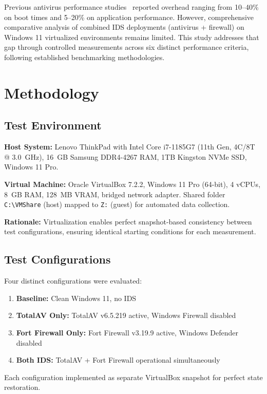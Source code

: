 \documentclass[runningheads,a4paper,english]{llncs}[2022/01/12]
\begin{document}
Previous antivirus performance studies~\cite{tomshardware-antivirus} reported overhead ranging from 10--40\% on boot times and 5--20\% on application performance. However, comprehensive comparative analysis of combined IDS deployments (antivirus + firewall) on Windows 11 virtualized environments remains limited. This study addresses that gap through controlled measurements across six distinct performance criteria, following established benchmarking methodologies.

\section{Methodology}
\label{sec:methodology}

\subsection{Test Environment}

\textbf{Host System:} Lenovo ThinkPad with Intel Core i7-1185G7 (11th Gen, 4C/8T @ 3.0~GHz), 16~GB Samsung DDR4-4267 RAM, 1TB Kingston NVMe SSD, Windows 11 Pro.

\textbf{Virtual Machine:} Oracle VirtualBox 7.2.2, Windows 11 Pro (64-bit), 4 vCPUs, 8~GB RAM, 128~MB VRAM, bridged network adapter. Shared folder \texttt{C:\textbackslash VMShare} (host) mapped to \texttt{Z:} (guest) for automated data collection.

\textbf{Rationale:} Virtualization enables perfect snapshot-based consistency between test configurations, ensuring identical starting conditions for each measurement.

\subsection{Test Configurations}

Four distinct configurations were evaluated:
\begin{enumerate}
\item \textbf{Baseline:} Clean Windows 11, no IDS
\item \textbf{TotalAV Only:} TotalAV v6.5.219 active, Windows Firewall disabled
\item \textbf{Fort Firewall Only:} Fort Firewall v3.19.9 active, Windows Defender disabled
\item \textbf{Both IDS:} TotalAV + Fort Firewall operational simultaneously
\end{enumerate}

Each configuration implemented as separate VirtualBox snapshot for perfect state restoration.
\end{document}
